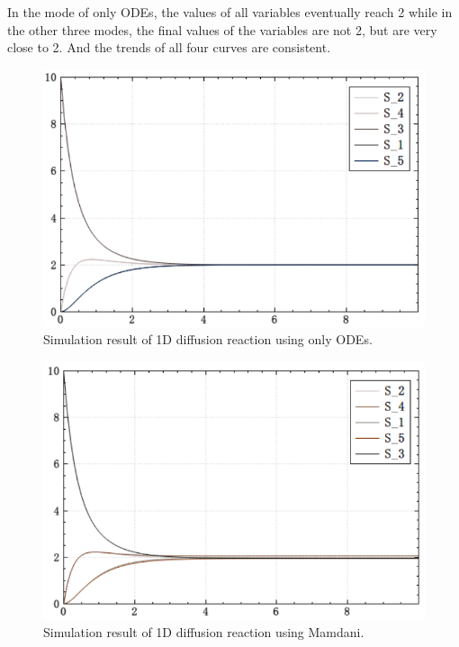 \documentclass[journal,a4paper,onecolumn]{article}
\begin{document}
In the mode of only ODEs, the values of all variables eventually reach 2 while in the other three modes, the final values of the variables are not 2, but are very close to 2. And the trends of all four curves are consistent.

\begin{figure}[!hbt]
	\begin{center}
		\includegraphics[width=\columnwidth]{fig21}
		\caption{Simulation result of 1D diffusion reaction using only ODEs.}
		\label{fig:Simulation result of 1D diffusion reaction using only ODEs.}
	\end{center}
\end{figure}

\begin{figure}[!hbt]
	\begin{center}
		\includegraphics[width=\columnwidth]{fig22}
		\caption{Simulation result of 1D diffusion reaction using Mamdani.}
		\label{fig:Simulation result of 1D diffusion reaction using Mamdani.}
	\end{center}
\end{figure}
\end{document}
